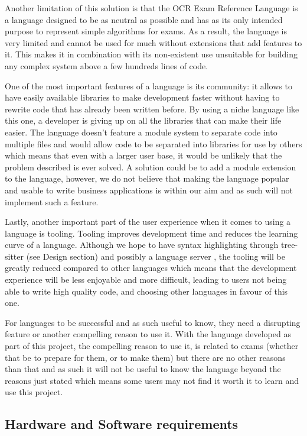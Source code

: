 \documentclass{article}
\begin{document}
Another limitation of this solution is that the OCR Exam Reference Language is
a language designed to be as neutral as possible and has as its only intended
purpose to represent simple algorithms for exams. As a result, the language is
very limited and cannot be used for much without extensions that add features
to it. This makes it in combination with its non-existent use unsuitable for
building any complex system above a few hundreds lines of code.

One of the most important features of a language is its community: it allows to
have easily available libraries to make development faster without having to
rewrite code that has already been written before. By using a niche language
like this one, a developer is giving up on all the libraries that can make
their life easier. The language doesn't feature a module system to separate
code into multiple files and would allow code to be separated into libraries
for use by others which means that even with a larger user base, it would be
unlikely that the problem described is ever solved. A solution could be to add
a module extension to the language, however, we do not believe that making the
language popular and usable to write business applications is within our aim
and as such will not implement such a feature.


Lastly, another important part of the user experience when it comes to using a
language is tooling. Tooling improves development time and reduces the learning
curve of a language. Although we hope to have syntax highlighting through
tree-sitter (see Design section) and possibly a language server \cite{lsp}, the
tooling will be greatly reduced compared to other languages which means that
the development experience will be less enjoyable and more difficult, leading
to users not being able to write high quality code, and choosing other
languages in favour of this one.

For languages to be successful and as such useful to know, they need a
disrupting feature or another compelling reason to use it. With the language
developed as part of this project, the compelling reason to use it, is related
to exams (whether that be to prepare for them, or to make them) but there are
no other reasons than that and as such it will not be useful to know the
language beyond the reasons just stated which means some users may not find it
worth it to learn and use this project.

\subsection{Hardware and Software requirements}
\end{document}
